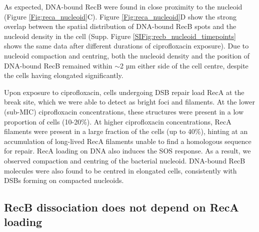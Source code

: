 As expected, DNA-bound RecB were found in close proximity to the nucleoid (Figure \ref{Fig:reca_nucleoid}C). Figure \ref{Fig:reca_nucleoid}D show the strong overlap between the spatial distribution of DNA-bound RecB spots and the nucleoid density in the cell (Supp. Figure \ref{SIFig:recb_nucleoid_timepoints} shows the same data after different durations of ciprofloxacin exposure). Due to nucleoid compaction and centring, both the nucleoid density and the position of DNA-bound RecB remained within $\sim$2 µm either side of the cell centre, despite the cells having elongated significantly.

Upon exposure to ciprofloxacin, cells undergoing DSB repair load RecA at the break site, which we were able to detect as bright foci and filaments. At the lower (sub-MIC) ciprofloxacin concentrations, these structures were present in a low proportion of cells (10-20\%). At higher ciprofloxacin concentrations, RecA filaments were present in a large fraction of the cells (up to 40\%), hinting at an accumulation of long-lived RecA filaments unable to find a homologous sequence for repair. RecA loading on DNA also induces the SOS response. As a result, we observed compaction and centring of the bacterial nucleoid. DNA-bound RecB molecules were also found to be centred in elongated cells, consistently with DSBs forming on compacted nucleoids.

\subsection*{RecB dissociation does not depend on RecA loading}


